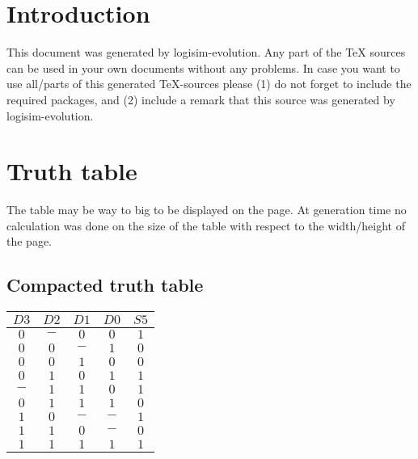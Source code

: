 \documentclass [15pt,a4paper,twoside]{article}
\begin{document}
\section{Introduction}
This document was generated by logisim-evolution. Any part of the TeX sources can be used in your own documents without any problems. In case you want to use all/parts of this generated TeX-sources please (1) do not forget to include the required packages, and (2) include a remark that this source was generated by logisim-evolution.
\section{Truth table}
The table may be way to big to be displayed on the page. At generation time no calculation was done on the size of the table with respect to the width/height of the page.
\subsection{Compacted truth table}
\begin{center}
\begin{tabular}{cccc|c}
$D3$&$D2$&$D1$&$D0$&$S5$\\
\hline
$0$&$-$&$0$&$0$&$1$\\
$0$&$0$&$-$&$1$&$0$\\
$0$&$0$&$1$&$0$&$0$\\
$0$&$1$&$0$&$1$&$1$\\
$-$&$1$&$1$&$0$&$1$\\
$0$&$1$&$1$&$1$&$0$\\
$1$&$0$&$-$&$-$&$1$\\
$1$&$1$&$0$&$-$&$0$\\
$1$&$1$&$1$&$1$&$1$\\

\end{tabular}
\end{center}
\end{document}
